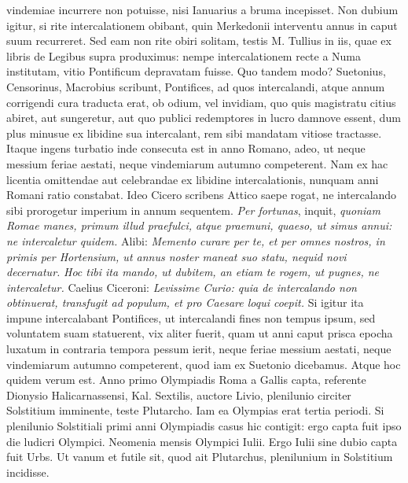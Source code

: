 vindemiae incurrere non potuisse, nisi Ianuarius a bruma incepisset.
Non dubium igitur, si rite intercalationem obibant, quin
Merkedonii interventu annus in caput suum recurreret.
Sed eam non
rite obiri solitam, testis M. Tullius in iis, quae ex libris de Legibus
supra produximus: nempe intercalationem recte a Numa institutam,
vitio Pontificum depravatam fuisse.
Quo tandem modo?
Suetonius,
Censorinus, Macrobius scribunt, Pontifices, ad quos intercalandi,
atque annum corrigendi cura traducta erat, ob odium,
vel invidiam, quo quis magistratu citius abiret, aut sungeretur,
aut quo publici redemptores in lucro damnove essent, dum plus minusue
ex libidine sua intercalant, rem sibi mandatam vitiose tractasse.
%
Itaque ingens turbatio inde consecuta est in anno Romano,
adeo, ut neque messium feriae aestati, neque vindemiarum autumno competerent.
Nam ex hac licentia omittendae aut celebrandae ex libidine
intercalationis, nunquam anni Romani ratio constabat.
Ideo Cicero
scribens Attico saepe rogat, ne intercalando sibi prorogetur imperium
in annum sequentem.
\textit{Per fortunas}, inquit, \textit{quoniam Romae
manes, primum illud praefulci, atque praemuni, quaeso, ut simus annui:
ne intercaletur quidem.}
Alibi: \textit{Memento curare per te, et per omnes
nostros, in primis per Hortensium, ut annus noster maneat suo statu,
nequid novi decernatur.}
\textit{Hoc tibi ita mando, ut dubitem, an etiam te
rogem, ut pugnes, ne intercaletur.}
Caelius Ciceroni: \textit{Levissime Curio:
quia de intercalando non obtinuerat, transfugit ad populum, et pro Caesare
loqui coepit.}
Si igitur ita impune intercalabant Pontifices, ut intercalandi
fines non tempus ipsum, sed voluntatem suam statuerent,
vix aliter fuerit, quam ut anni caput prisca epocha luxatum in contraria
tempora pessum ierit, neque feriae messium aestati, neque vindemiarum
autumno competerent, quod iam ex Suetonio dicebamus.
Atque hoc quidem verum est.
Anno primo Olympiadis
 Roma a Gallis capta, referente Dionysio Halicarnassensi,
 Kal. Sextilis, auctore Livio, plenilunio circiter
 Solstitium imminente,
teste Plutarcho.
Iam ea Olympias erat tertia periodi.
Si plenilunio
Solstitiali primi anni Olympiadis casus hic contigit: ergo
capta fuit ipso die ludicri Olympici.
Neomenia mensis Olympici
 Iulii.
Ergo  Iulii sine dubio capta fuit Urbs.
Ut vanum et
futile sit, quod ait Plutarchus, plenilunium in Solstitium incidisse.
